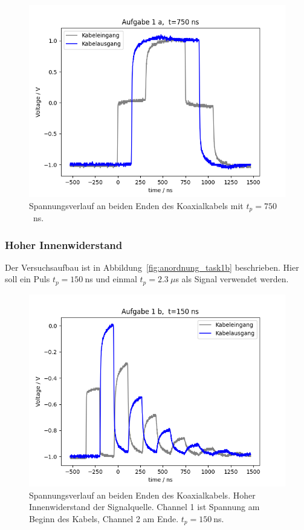 \documentclass{article}
\begin{document}
\begin{figure}[H]
\centering
\caption{Spannungsverlauf an beiden Enden des Koaxialkabels mit $t_p=750$~ns.}
\label{fig:task1a_750ns}
\includegraphics[scale=0.6]{bilder/task1a/task1a_750ns.png}
\end{figure}





\subsubsection{Hoher Innenwiderstand}
Der Versuchsaufbau ist in Abbildung~\ref{fig:anordnung_task1b} beschrieben. Hier soll ein Puls $t_p = 150~$ns und einmal $t_p = 2.3~\mu$s  als Signal verwendet werden.


\begin{figure}[H]
\centering
\caption{Spannungsverlauf an beiden Enden des Koaxialkabels. Hoher Innenwiderstand der Signalquelle. Channel 1 ist Spannung am Beginn des Kabels, Channel 2 am Ende. $t_p = 150~$ns.}
\label{fig:task1b_150ns}
\includegraphics[scale=0.6]{bilder/task1b/task1b_150ns.png}
\end{figure}
\end{document}
